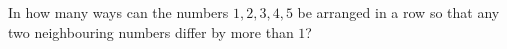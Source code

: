 In how many ways can the numbers $1,2,3,4,5$ be arranged in a row so that any two neighbouring numbers differ by more than $1$?

